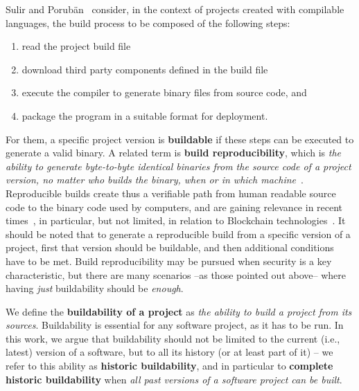 


Sulir and Porub\"an~\cite{Sulir:2016:QSJ:3001878.3001882} consider, in the context of projects created with compilable languages, the build process to be composed of the following steps:

\begin{enumerate}
	\item read the project build file
	\item download third party components defined in the build file
	\item execute the compiler to generate  binary files from source code, and
	\item package the program in a suitable format for deployment.
\end{enumerate}

For them, a specific project version is {\bf buildable} if these steps can be executed to generate a valid binary.
A related term is {\bf build reproducibility}, which is \emph{the ability to generate byte-to-byte identical binaries from the source code of a project version, no matter who builds the binary, when or in which machine}~\cite{RepBldsDebian:2018:Online}.
Reproducible builds create thus a verifiable path from human readable source code to the binary code used by computers, and are gaining relevance in recent times~\cite{cito2017empirical, maudoux2018correct}, in particular, but not limited, in relation to Blockchain technologies~\cite{deCarnedeCarnavalet:2014:CIV:2664243.2664288, perry2014reproducible}.
It should be noted that to generate a reproducible build from a specific version of a project, first that version should be buildable, and then additional conditions have to be met.
Build reproducibility may be pursued when security is a key characteristic, but there are many scenarios --as those pointed out above-- where having \emph{just} buildability should be \emph{enough}.

We define the {\bf buildability of a project} as \emph{the ability to build a project from its sources}.
Buildability is essential for any software project, as it has to be run.
In this work, we argue that buildability should not be limited to the current (i.e., latest) version of a software, but to all its history (or at least part of it) -- we refer to this ability as {\bf historic buildability}, and in particular to {\bf complete historic buildability} when \emph{all past versions of a software project can be built}.

